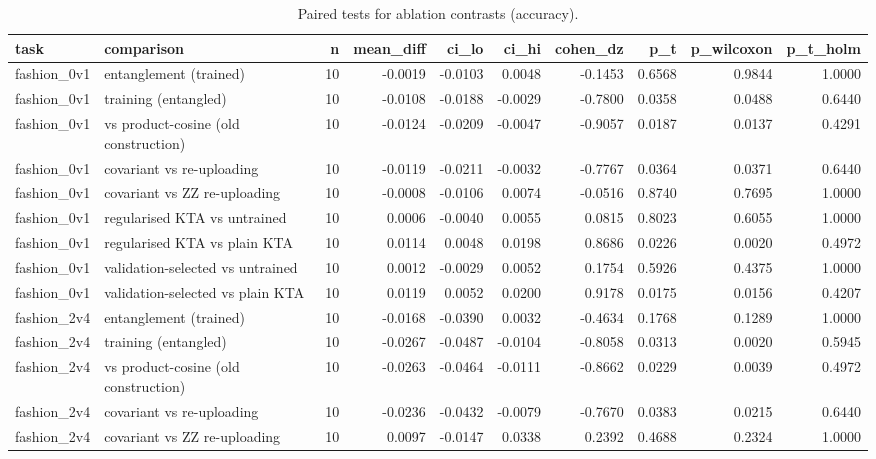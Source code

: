 \begin{table}
\caption{Paired tests for ablation contrasts (accuracy).}
\label{tab:table3_ablation_stats}
\begin{tabular}{llrrrrrrrr}
\toprule
task & comparison & n & mean\_diff & ci\_lo & ci\_hi & cohen\_dz & p\_t & p\_wilcoxon & p\_t\_holm \\
\midrule
fashion\_0v1 & entanglement (trained) & 10 & -0.0019 & -0.0103 & 0.0048 & -0.1453 & 0.6568 & 0.9844 & 1.0000 \\
fashion\_0v1 & training (entangled) & 10 & -0.0108 & -0.0188 & -0.0029 & -0.7800 & 0.0358 & 0.0488 & 0.6440 \\
fashion\_0v1 & vs product-cosine (old construction) & 10 & -0.0124 & -0.0209 & -0.0047 & -0.9057 & 0.0187 & 0.0137 & 0.4291 \\
fashion\_0v1 & covariant vs re-uploading & 10 & -0.0119 & -0.0211 & -0.0032 & -0.7767 & 0.0364 & 0.0371 & 0.6440 \\
fashion\_0v1 & covariant vs ZZ re-uploading & 10 & -0.0008 & -0.0106 & 0.0074 & -0.0516 & 0.8740 & 0.7695 & 1.0000 \\
fashion\_0v1 & regularised KTA vs untrained & 10 & 0.0006 & -0.0040 & 0.0055 & 0.0815 & 0.8023 & 0.6055 & 1.0000 \\
fashion\_0v1 & regularised KTA vs plain KTA & 10 & 0.0114 & 0.0048 & 0.0198 & 0.8686 & 0.0226 & 0.0020 & 0.4972 \\
fashion\_0v1 & validation-selected vs untrained & 10 & 0.0012 & -0.0029 & 0.0052 & 0.1754 & 0.5926 & 0.4375 & 1.0000 \\
fashion\_0v1 & validation-selected vs plain KTA & 10 & 0.0119 & 0.0052 & 0.0200 & 0.9178 & 0.0175 & 0.0156 & 0.4207 \\
fashion\_2v4 & entanglement (trained) & 10 & -0.0168 & -0.0390 & 0.0032 & -0.4634 & 0.1768 & 0.1289 & 1.0000 \\
fashion\_2v4 & training (entangled) & 10 & -0.0267 & -0.0487 & -0.0104 & -0.8058 & 0.0313 & 0.0020 & 0.5945 \\
fashion\_2v4 & vs product-cosine (old construction) & 10 & -0.0263 & -0.0464 & -0.0111 & -0.8662 & 0.0229 & 0.0039 & 0.4972 \\
fashion\_2v4 & covariant vs re-uploading & 10 & -0.0236 & -0.0432 & -0.0079 & -0.7670 & 0.0383 & 0.0215 & 0.6440 \\
fashion\_2v4 & covariant vs ZZ re-uploading & 10 & 0.0097 & -0.0147 & 0.0338 & 0.2392 & 0.4688 & 0.2324 & 1.0000 \\

\end{tabular}
\end{table}
